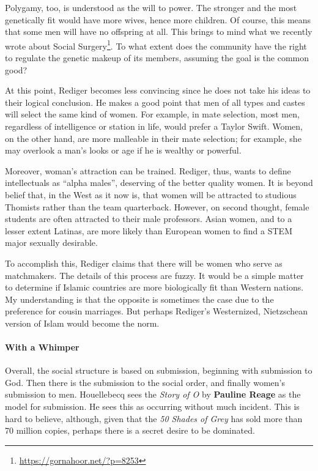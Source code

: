 Polygamy, too, is understood as the will to power. The stronger and the most genetically fit would have more wives, hence more children. Of course, this means that some men will have no offspring at all. This brings to mind what we recently wrote about Social Surgery\footnote{\url{https://gornahoor.net/?p=8253}}. To what extent does the community have the right to regulate the genetic makeup of its members, assuming the goal is the common good?

At this point, Rediger becomes less convincing since he does not take his ideas to their logical conclusion. He makes a good point that men of all types and castes will select the same kind of women. For example, in mate selection, most men, regardless of intelligence or station in life, would prefer a Taylor Swift. Women, on the other hand, are more malleable in their mate selection; for example, she may overlook a man's looks or age if he is wealthy or powerful.

Moreover, woman's attraction can be trained. Rediger, thus, wants to define intellectuals as ``alpha males'', deserving of the better quality women. It is beyond belief that, in the West as it now is, that women will be attracted to studious Thomists rather than the team quarterback. However, on second thought, female students are often attracted to their male professors. Asian women, and to a lesser extent Latinas, are more likely than European women to find a STEM major sexually desirable.

To accomplish this, Rediger claims that there will be women who serve as matchmakers. The details of this process are fuzzy. It would be a simple matter to determine if Islamic countries are more biologically fit than Western nations. My understanding is that the opposite is sometimes the case due to the preference for cousin marriages. But perhaps Rediger's Westernized, Nietzschean version of Islam would become the norm.

\paragraph{With a Whimper}


Overall, the social structure is based on submission, beginning with submission to God. Then there is the submission to the social order, and finally women's submission to men. Houellebecq sees the \emph{Story of O} by \textbf{Pauline Reage} as the model for submission. He sees this as occurring without much incident. This is hard to believe, although, given that the \emph{50 Shades of Grey} has sold more than 70 million copies, perhaps there is a secret desire to be dominated.

